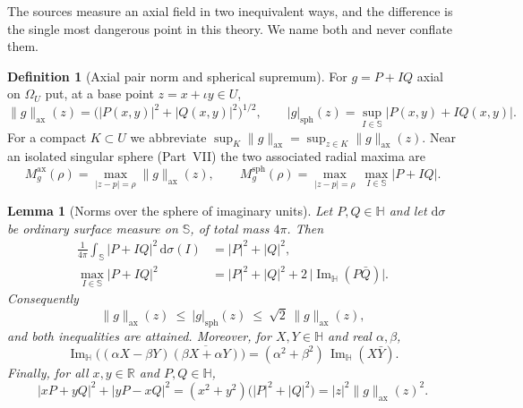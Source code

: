 \documentclass[11pt,a4paper]{article}
\numberwithin{equation}{section}
\newtheorem{lemma}[theorem]{Lemma}
\theoremstyle{definition}
\newtheorem{definition}[theorem]{Definition}
\theoremstyle{remark}
\theoremstyle{plain}
\newcommand{\HH}{\mathbb H}
\newcommand{\RR}{\mathbb R}
\newcommand{\SSS}{\mathbb S}
\DeclareMathOperator{\Ima}{Im}
\newcommand{\ImH}{\Ima_{\HH}}
\newcommand{\Om}{\Omega}
\newcommand{\axn}[1]{\lVert #1\rVert_{\mathrm{ax}}}   %
\newcommand{\Msph}{M^{\mathrm{sph}}}                  %
\newcommand{\Max}{M^{\mathrm{ax}}}                    %
\newcommand{\abs}[1]{\lvert #1\rvert}
\newcommand{\dd}{\mathrm d}
\begin{document}
The sources measure an axial field in two inequivalent ways, and the
difference is the single most dangerous point in this theory.  We name both
and never conflate them.

\begin{definition}[Axial pair norm and spherical supremum]
\label{d:def:norms}
For $g=P+IQ$ axial on $\Om_U$ put, at a base point $z=x+\iota y\in U$,
\begin{equation}
 \axn{g}(z)=\bigl(\abs{P(x,y)}^2+\abs{Q(x,y)}^2\bigr)^{1/2},
 \qquad
 \abs{g}_{\mathrm{sph}}(z)=\sup_{I\in\SSS}\abs{P(x,y)+IQ(x,y)} .
 \label{d:eq:twonorms}
\end{equation}
For a compact $K\subset U$ we abbreviate $\sup_K\axn{g}=\sup_{z\in K}\axn{g}(z)$.  Near
an isolated singular sphere (Part~VII) the two associated radial maxima are
\begin{equation}
 \Max_g(\rho)=\max_{\abs{z-p}=\rho}\axn{g}(z),
 \qquad
 \Msph_g(\rho)=\max_{\abs{z-p}=\rho}\ \max_{I\in\SSS}\abs{P+IQ} .
 \label{d:eq:radialnorms}
\end{equation}
\end{definition}

\begin{lemma}[Norms over the sphere of imaginary units]
\label{d:lem:sphere-norm}
Let $P,Q\in\HH$ and let $\dd\sigma$ be ordinary surface measure on
$\SSS$, of total mass $4\pi$.  Then
\begin{align}
 \frac1{4\pi}\int_{\SSS}\abs{P+IQ}^2\,\dd\sigma(I)
   &=\abs P^2+\abs Q^2,
   \label{d:eq:sphere-mean}\\
 \max_{I\in\SSS}\abs{P+IQ}^2
   &=\abs P^2+\abs Q^2+2\,\bigl\lvert\ImH(P\bar Q)\bigr\rvert .
   \label{d:eq:sphere-max}
\end{align}
Consequently
\begin{equation}
 \axn{g}(z)\ \le\ \abs{g}_{\mathrm{sph}}(z)\ \le\ \sqrt2\,\axn{g}(z),
 \label{d:eq:norm-equivalence}
\end{equation}
and both inequalities are attained.  Moreover, for $X,Y\in\HH$ and real
$\alpha,\beta$,
\begin{equation}
 \ImH\bigl((\alpha X-\beta Y)\overline{(\beta X+\alpha Y)}\bigr)
 =(\alpha^2+\beta^2)\,\ImH(X\bar Y).
 \label{d:eq:rotation-cross}
\end{equation}
Finally, for all $x,y\in\RR$ and $P,Q\in\HH$,
\begin{equation}
 \abs{xP+yQ}^2+\abs{yP-xQ}^2=(x^2+y^2)\bigl(\abs P^2+\abs Q^2\bigr)
 =\abs z^2\axn{g}(z)^2 .
 \label{d:eq:rotation-real}
\end{equation}
\end{lemma}
\end{document}
